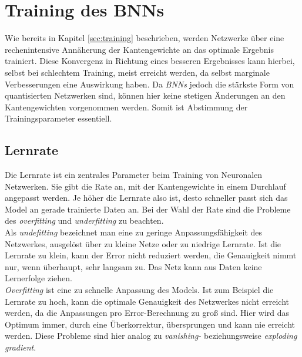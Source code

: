 \chapter{Training des BNNs}
Wie bereits in Kapitel \ref{sec:training} beschrieben, werden Netzwerke über eine rechenintensive Annäherung der Kantengewichte an das optimale Ergebnis trainiert. Diese Konvergenz in Richtung eines besseren Ergebnisses kann hierbei, selbst bei schlechtem Training, meist erreicht werden, da selbst marginale Verbesserungen eine Auswirkung haben. Da \textit{BNNs} jedoch die stärkste Form von quantisierten Netzwerken sind, können hier keine stetigen Änderungen an den Kantengewichten vorgenommen werden. Somit ist Abstimmung der Trainingsparameter essentiell.
\section{Lernrate}
Die Lernrate ist ein zentrales Parameter beim Training von Neuronalen Netzwerken. Sie gibt die Rate an, mit der Kantengewichte in einem Durchlauf angepasst werden. Je höher die Lernrate also ist, desto schneller passt sich das Model an gerade trainierte Daten an. Bei der Wahl der Rate sind die Probleme des \textit{overfitting} und \textit{underfitting} zu beachten.\\ 
Als \textit{undefitting} bezeichnet man eine zu geringe Anpassungsfähigkeit des Netzwerkes, ausgelöst über zu kleine Netze oder zu niedrige Lernrate. Ist die Lernrate zu klein, kann der Error nicht reduziert werden, die Genauigkeit nimmt nur, wenn überhaupt, sehr langsam zu. Das Netz kann aus Daten keine Lernerfolge ziehen.\\
\textit{Overfitting} ist eine zu schnelle Anpassung des Models. Ist zum Beispiel die Lernrate zu hoch, kann die optimale Genauigkeit des Netzwerkes nicht erreicht werden, da die Anpassungen pro Error-Berechnung zu groß sind. Hier wird das Optimum immer, durch eine Überkorrektur, übersprungen und kann nie erreicht werden\cite{smith2018}. Diese Probleme sind hier analog zu \textit{vanishing-} beziehungsweise \textit{exploding gradient}.

